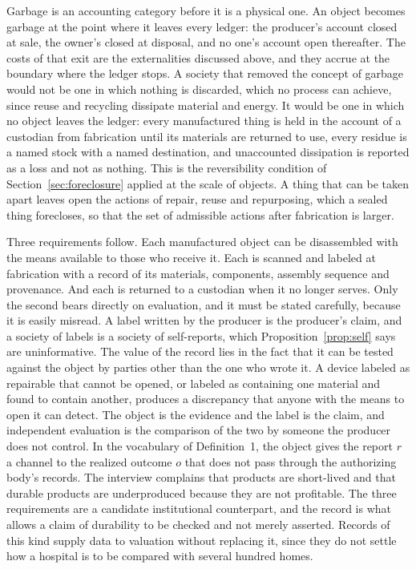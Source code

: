 \documentclass[12pt]{article}
\theoremstyle{definition}
\begin{document}
Garbage is an accounting category before it is a physical one. An object becomes garbage at the point where it leaves every ledger: the producer's account closed at sale, the owner's closed at disposal, and no one's account open thereafter. The costs of that exit are the externalities discussed above, and they accrue at the boundary where the ledger stops. A society that removed the concept of garbage would not be one in which nothing is discarded, which no process can achieve, since reuse and recycling dissipate material and energy. It would be one in which no object leaves the ledger: every manufactured thing is held in the account of a custodian from fabrication until its materials are returned to use, every residue is a named stock with a named destination, and unaccounted dissipation is reported as a loss and not as nothing. This is the reversibility condition of Section~\ref{sec:foreclosure} applied at the scale of objects. A thing that can be taken apart leaves open the actions of repair, reuse and repurposing, which a sealed thing forecloses, so that the set of admissible actions after fabrication is larger.

Three requirements follow. Each manufactured object can be disassembled with the means available to those who receive it. Each is scanned and labeled at fabrication with a record of its materials, components, assembly sequence and provenance. And each is returned to a custodian when it no longer serves. Only the second bears directly on evaluation, and it must be stated carefully, because it is easily misread. A label written by the producer is the producer's claim, and a society of labels is a society of self-reports, which Proposition~\ref{prop:self} says are uninformative. The value of the record lies in the fact that it can be tested against the object by parties other than the one who wrote it. A device labeled as repairable that cannot be opened, or labeled as containing one material and found to contain another, produces a discrepancy that anyone with the means to open it can detect. The object is the evidence and the label is the claim, and independent evaluation is the comparison of the two by someone the producer does not control. In the vocabulary of Definition~1, the object gives the report $r$ a channel to the realized outcome $o$ that does not pass through the authorizing body's records. The interview complains that products are short-lived and that durable products are underproduced because they are not profitable. The three requirements are a candidate institutional counterpart, and the record is what allows a claim of durability to be checked and not merely asserted. Records of this kind supply data to valuation without replacing it, since they do not settle how a hospital is to be compared with several hundred homes.
\end{document}
